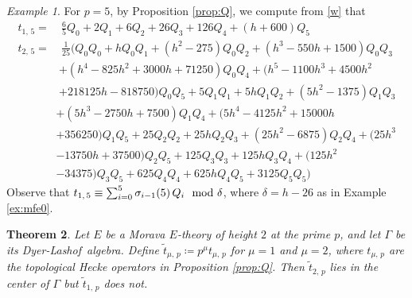 \documentclass{gtpart}
\newtheorem{thm}{Theorem}
\theoremstyle{definition}
\theoremstyle{remark}
\newtheorem{ex}[thm]{Example}
\newcommand{\DL}{Dyer-Lashof~}
\newcommand{\md}{~~{\rm mod}~}
\renewcommand{\d}{\delta}
\newcommand{\G}{\Gamma}
\newcommand{\si}{\sigma}
\newcommand{\ce}{\coloneqq}
\renewcommand{\=}{\approx}
\renewcommand{\-}{\sim}
\numberwithin{equation}{section}
\numberwithin{thm}{section}
\begin{document}
\begin{ex}
 \label{ex:t5}
 For $p = 5$, by Proposition \ref{prop:Q}, we compute from \eqref{w} that 
 \begin{equation*}
  \begin{split}
   t_{1,\,5} = & ~ \frac{6}{5} Q_0 + 2 Q_1 + 6 Q_2 + 26 Q_3 + 126 Q_4 
                 + (h + 600) Q_5 \\
   t_{2,\,5} = & ~ \frac{1}{25} \big( Q_0 Q_0 + h Q_0 Q_1 + (h^2 - 275) Q_0 Q_2 
                 + (h^3 - 550 h + 1500) Q_0 Q_3 \\
               & + (h^4 - 825 h^2 + 3000 h + 71250) Q_0 Q_4 + (h^5 - 1100 h^3 
                 + 4500 h^2 \\
               & + 218125 h - 818750) Q_0 Q_5 + 5 Q_1 Q_1 + 5 h Q_1 Q_2 + (5 h^2 
                 - 1375) Q_1 Q_3 
  \end{split}
 \end{equation*}
 \begin{equation*}
  \begin{split}
     \qquad~~~ & + (5 h^3 - 2750 h + 7500) Q_1 Q_4 + (5 h^4 - 4125 h^2 
                 + 15000 h \\
               & + 356250) Q_1 Q_5 + 25 Q_2 Q_2 + 25 h Q_2 Q_3 + (25 h^2 
                 - 6875) Q_2 Q_4 + (25 h^3 \\
               & - 13750 h + 37500) Q_2 Q_5 + 125 Q_3 Q_3 + 125 h Q_3 Q_4 
                 + (125 h^2 \\
               & - 34375) Q_3 Q_5 + 625 Q_4 Q_4 + 625 h Q_4 Q_5 
                 + 3125 Q_5 Q_5 \big) 
  \end{split}
 \end{equation*}
 Observe that $t_{1,\,5} \equiv \sum_{i = 0}^5 \si_{i - 1}(5) \, Q_i \md \d$, 
 where $\d = h - 26$ as in Example \ref{ex:mfe0}.  
\end{ex}

\begin{thm}
 \label{thm:center}
 Let $E$ be a Morava $E$-theory of height $2$ at the prime $p$, and let $\G$ be 
 its \DL algebra.  Define $\tilde{t}_{\mu,\,p} \ce p^\mu t_{\mu,\,p}$ for 
 $\mu = 1$ and $\mu = 2$, where $t_{\mu,\,p}$ are the topological Hecke 
 operators in Proposition \ref{prop:Q}.  Then $\tilde{t}_{2,\,p}$ lies in the 
 center of $\G$ but $\tilde{t}_{1,\,p}$ does not.  
\end{thm}
\end{document}

